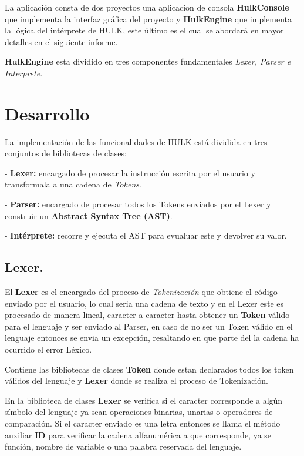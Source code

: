 \documentclass[a4paper,12pt]{article}
\begin{document}
	La aplicación consta de dos proyectos una aplicacion de consola \textbf{HulkConsole} que implementa la interfaz gráfica del proyecto y \textbf{HulkEngine} que implementa la lógica del intérprete de HULK, este último es el cual se abordará en mayor detalles en el siguiente informe.
	
	\textbf{HulkEngine} esta dividido en tres componentes fundamentales \emph{Lexer, Parser e Interprete}.
	
	\newpage
	
	\section{Desarrollo}\label{sec:desarrollo}
	
	La implementación de las funcionalidades de HULK  está dividida en tres conjuntos de bibliotecas de clases:
	
	- \textbf{Lexer:} encargado de procesar la instrucción escrita por el usuario y transformala a una cadena de \emph{Tokens}.
	
	- \textbf{Parser:} encargado de procesar todos los Tokens enviados por el Lexer y construir un \textbf{Abstract Syntax Tree (AST)}.
	
	- \textbf{Intérprete:} recorre y ejecuta el AST para evualuar este y devolver su valor.
	
	\subsection{Lexer.}\label{sub:lexer}
	El \textbf{Lexer} es el encargado del proceso de \emph{Tokenización} que obtiene el código enviado por el usuario, lo cual seria una cadena de texto y en el Lexer este es procesado de manera lineal, caracter a caracter hasta obtener un \textbf{Token} válido para el lenguaje y ser enviado al Parser, en caso de no ser un Token válido en el lenguaje entonces se envia un excepción, resaltando en que parte del la cadena ha ocurrido el error Léxico.
	
	Contiene las bibliotecas de clases \textbf{Token} donde estan declarados todos los token válidos del lenguaje y \textbf{Lexer} donde se realiza el proceso de Tokenización.
	
	En la biblioteca de clases \textbf{Lexer} se verifica si el caracter corresponde a algún símbolo del lenguaje ya sean operaciones binarias, unarias o operadores de comparación. Si el caracter enviado es una letra entonces se llama el método auxiliar \textbf{ID} para verificar la cadena alfanumérica a que corresponde, ya se función, nombre de variable o una palabra reservada del lenguaje. 
	
\end{document}
